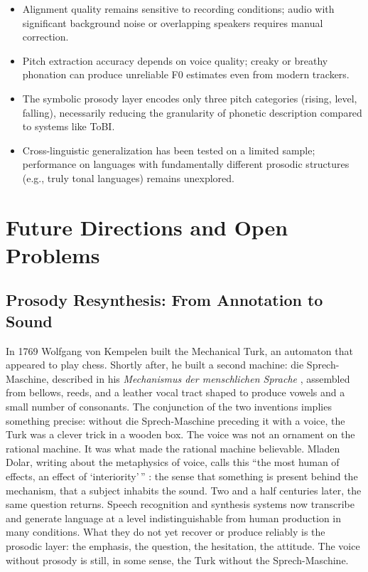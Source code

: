 \begin{itemize}
\item Alignment quality remains sensitive to recording conditions; audio with significant background noise or overlapping speakers requires manual correction.
\item Pitch extraction accuracy depends on voice quality; creaky or breathy phonation can produce unreliable F0 estimates even from modern trackers.
\item The symbolic prosody layer encodes only three pitch categories (rising, level, falling), necessarily reducing the granularity of phonetic description compared to systems like ToBI.
\item Cross-linguistic generalization has been tested on a limited sample; performance on languages with fundamentally different prosodic structures (e.g., truly tonal languages) remains unexplored.
\end{itemize}

\section{Future Directions and Open Problems}
\label{ch:discussion}

\subsection{Prosody Resynthesis: From Annotation to Sound}
\label{sec:resynthesis}

In 1769 Wolfgang von Kempelen built the Mechanical Turk, an automaton that
appeared to play chess. Shortly after, he built a second machine: die
Sprech-Maschine, described in his \textit{Mechanismus der menschlichen
Sprache} \cite{kempelen1791}, assembled from bellows, reeds, and a leather
vocal tract shaped to produce vowels and a small number of consonants. The
conjunction of the two inventions implies something precise: without die
Sprech-Maschine preceding it with a voice, the Turk was a clever trick in
a wooden box. The voice was not an ornament on the rational machine. It was
what made the rational machine believable. Mladen Dolar, writing about the
metaphysics of voice, calls this ``the most human of effects, an effect of
`interiority'\,'' \cite[10]{dolar2006}: the sense that something is present
behind the mechanism, that a subject inhabits the sound. Two and a half
centuries later, the same question returns. Speech recognition and synthesis
systems now transcribe and generate language at a level indistinguishable
from human production in many conditions. What they do not yet recover or
produce reliably is the prosodic layer: the emphasis, the question, the
hesitation, the attitude. The voice without prosody is still, in some sense,
the Turk without the Sprech-Maschine.

